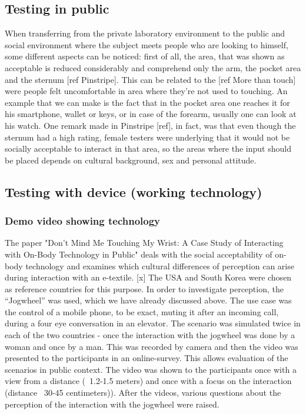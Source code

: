 \documentclass{sigchi}
\begin{document}
\subsection{Testing in public}
%
When transferring from the private laboratory environment to the public and social environment where the subject meets people who are looking to himself, some different aspects can be noticed: first of all, the area, that was shown as acceptable is reduced considerably and comprehend only the arm, the pocket area and the sternum [ref Pinstripe]. This can be related to the [ref More than touch] were people felt uncomfortable in area where they’re not used to touching. An example that we can make is the fact that in the pocket area one reaches it for his smartphone, wallet or keys, or in case of the forearm, usually one can look at his watch. One remark made in Pinstripe [ref], in fact, was that even though the sternum had a high rating, female testers were underlying that it would not be socially acceptable to interact in that area, so the areas where the input should be placed depends on cultural background, sex and personal attitude.

\subsection{Testing with device (working technology)}



\subsubsection{Demo video showing technology}
The paper "Don't Mind Me Touching My Wrist: A Case Study of Interacting with On-Body Technology in Public" deals with the social acceptability of on-body technology and examines which cultural differences of perception can arise during interaction with an e-textile. [x] The USA and South Korea were chosen as reference countries for this purpose. In order to investigate perception, the “Jogwheel” was used, which we have already discussed above. The use case was the control of a mobile phone, to be exact, muting it after an incoming call, during a four eye conversation in an elevator. The scenario was simulated twice in each of the two countries - once the interaction with the jogwheel was done by a woman and once by a man. This was recorded by camera and then the video was presented to the participants in an online-survey. This allows evaluation of the scenarios in public context. The video was shown to the participants once with a view from a distance (~1.2-1.5 meters) and once with a focus on the interaction (distance ~30-45 centimeters)). After the videos, various questions  about the perception of the interaction with the jogwheel were raised. %
\end{document}

